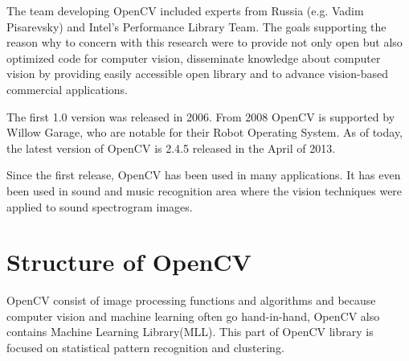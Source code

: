 The team developing OpenCV included experts from Russia (e.g. Vadim Pisarevsky) and Intel's Performance Library Team.  
The goals supporting the reason why to concern with this research were to provide not only open but also optimized code for computer vision,
disseminate knowledge about computer vision by providing easily accessible open library and to advance vision-based commercial applications.

The first 1.0 version was released in 2006.
From 2008 OpenCV is supported by Willow Garage, who are notable for their Robot Operating System.
As of today, the latest version of OpenCV is 2.4.5 released in the April of 2013.

Since the first release, OpenCV has been used in many applications. 
It has even been used in sound and music recognition area where the vision techniques were applied to sound spectrogram images.

\section{Structure of OpenCV}
OpenCV consist of image processing functions and algorithms and because computer vision and machine learning often go hand-in-hand, 
OpenCV also contains Machine Learning Library(MLL).
This part of OpenCV library is focused on statistical pattern recognition and clustering. 

